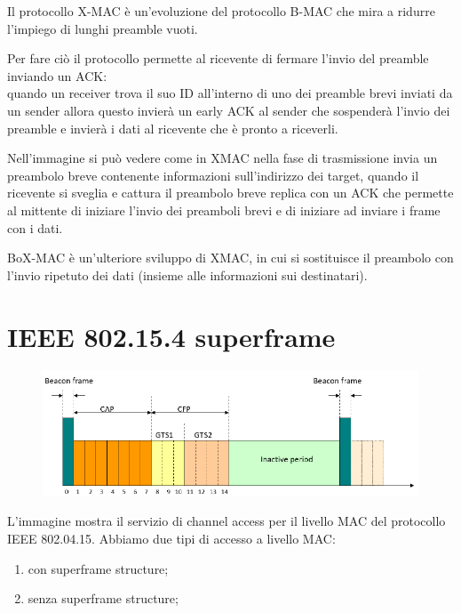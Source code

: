Il protocollo X-MAC è un'evoluzione del protocollo B-MAC che mira a ridurre l'impiego di lunghi preamble vuoti. 

Per fare ciò il protocollo permette al ricevente di fermare l'invio del preamble inviando un ACK:\\
quando un receiver trova il suo ID all'interno di uno dei preamble brevi inviati da un sender allora questo invierà un early ACK al sender che sospenderà l'invio dei preamble e invierà i dati al ricevente che è pronto a riceverli. 

Nell'immagine si può vedere come in XMAC nella fase di trasmissione invia un preambolo breve contenente informazioni sull'indirizzo dei target, quando il ricevente si sveglia e cattura il preambolo breve replica con un ACK che permette al mittente di iniziare l'invio dei preamboli brevi e di iniziare ad inviare i frame con i dati.

BoX-MAC è un'ulteriore sviluppo di XMAC, in cui si sostituisce il preambolo con l'invio ripetuto dei dati (insieme alle informazioni sui destinatari).

\section{IEEE 802.15.4 superframe}

\begin{figure}[htbp]
   \centering
   \includegraphics{images/questions/Schermata del 2023-10-20 11-49-03.png}
   \label{fig:dom21}
\end{figure}

L'immagine mostra il servizio di channel access per il livello MAC del protocollo IEEE 802.04.15. Abbiamo due tipi di accesso a livello MAC:
{
   \ns
   \begin{enumerate}
      \item con superframe structure;
      \item senza superframe structure;
      \end{enumerate}
      
      }

